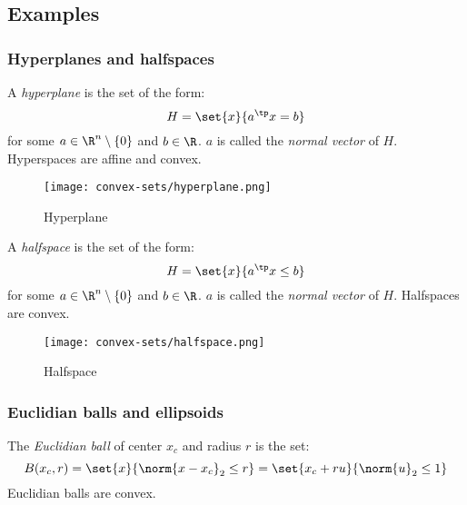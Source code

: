 \subsection{Examples}
\subsubsection{Hyperplanes and halfspaces}
\begin{definition}[Hyperplane]
    A \emph{hyperplane} is the set of the form:
    \begin{equation*}
        H = \set{x}{a^\tp x = b}
    \end{equation*}
    for some $a\in\R^n\setminus\{0\}$ and $b\in\R$. $a$ is called the \emph{normal vector} of $H$. Hyperspaces are affine and convex.

    \begin{figure}[H]
        \centering
        \texttt{[image: convex-sets/hyperplane.png]}
        \caption{Hyperplane}
    \end{figure}
\end{definition}

\begin{definition}[Halfspace]
    A \emph{halfspace} is the set of the form:
    \begin{equation*}
        H = \set{x}{a^\tp x\leq b}
    \end{equation*}
    for some $a\in\R^n\setminus\{0\}$ and $b\in\R$. $a$ is called the \emph{normal vector} of $H$. Halfspaces are convex.

    \begin{figure}[H]
        \centering
        \texttt{[image: convex-sets/halfspace.png]}
        \caption{Halfspace}
    \end{figure}
\end{definition}

\subsubsection{Euclidian balls and ellipsoids}
\begin{definition}
    The \emph{Euclidian ball} of center $x_c$ and radius $r$ is the set:
    \begin{equation*}
        B(x_c, r) = \set{x}{\norm{x - x_c}_2\leq r} = \set{x_c+ru}{\norm{u}_2\leq 1}
    \end{equation*}
    Euclidian balls are convex.
\end{definition}


